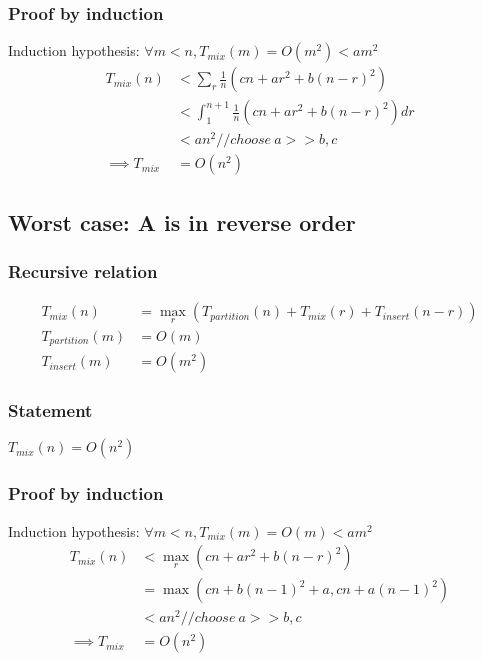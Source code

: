 \documentclass{article}
\begin{document}
\subsubsection{Proof by induction}
Induction hypothesis: $\forall m < n, T_{mix}(m) = O(m^2) < am^2$
\begin{align*}
T_{mix}(n)
&< \sum_r \frac{1}{n}(cn + ar^2 + b(n-r)^2)\\
&< \int_1^{n+1} \frac{1}{n}(cn + ar^2 + b(n-r)^2) dr\\
&< an^2  // choose \ a >> b, c\\
\implies T_{mix} &= O(n^2)
\end{align*}

\subsection{Worst case: A is in reverse order}

\subsubsection{Recursive relation}
\begin{align*}
T_{mix}(n) &= \max_r (T_{partition}(n) + T_{mix}(r) + T_{insert}(n-r))\\
T_{partition}(m) &= O(m)\\
T_{insert}(m) &= O(m^2)
\end{align*}

\subsubsection{Statement}
$T_{mix}(n) = O(n^2)$

\subsubsection{Proof by induction}
Induction hypothesis: $\forall m < n, T_{mix}(m) = O(m) < am^2$
\begin{align*}
T_{mix}(n)
&< \max_r(cn + ar^2 + b(n-r)^2)\\
&= \max (cn + b(n-1)^2 + a, cn + a(n-1)^2)\\
&< an^2  // choose \ a >> b, c\\
\implies T_{mix} &= O(n^2)
\end{align*}
\end{document}
